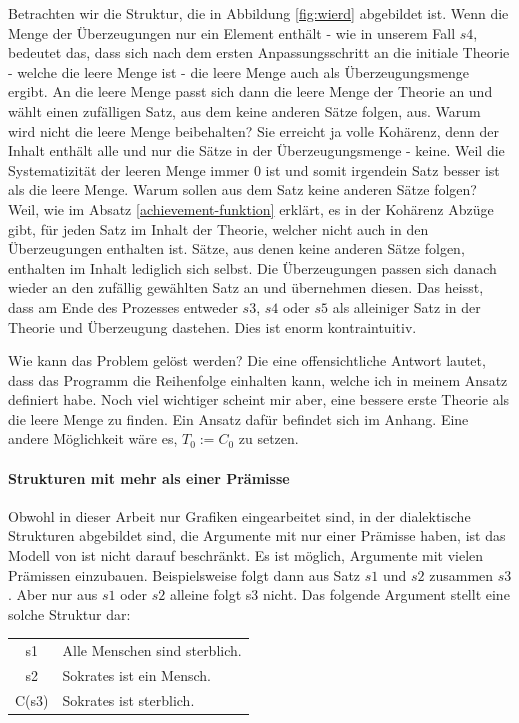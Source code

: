 \documentclass{article}
\begin{document}
Betrachten wir die Struktur, die in Abbildung \ref{fig:wierd} abgebildet ist. Wenn die Menge der Überzeugungen nur ein Element enthält - wie in unserem Fall $s4$, bedeutet das, dass sich nach dem ersten Anpassungsschritt an die initiale Theorie - welche die leere Menge ist - die leere Menge auch als Überzeugungsmenge ergibt. An die leere Menge passt sich dann die leere Menge der Theorie an und wählt einen zufälligen Satz, aus dem keine anderen Sätze folgen, aus. Warum wird nicht die leere Menge beibehalten? Sie erreicht ja volle Kohärenz, denn der Inhalt enthält alle und nur die Sätze in der Überzeugungsmenge - keine. Weil die Systematizität der leeren Menge immer 0 ist und somit irgendein Satz besser ist als die leere Menge. Warum sollen aus dem Satz keine anderen Sätze folgen? Weil, wie im Absatz \ref{achievement-funktion} erklärt, es in der Kohärenz Abzüge gibt, für jeden Satz im Inhalt der Theorie, welcher nicht auch in den Überzeugungen enthalten ist. Sätze, aus denen keine anderen Sätze folgen,  enthalten im Inhalt lediglich sich selbst.
Die Überzeugungen passen sich danach wieder an den zufällig gewählten Satz an und übernehmen diesen. Das heisst, dass am Ende des Prozesses entweder $s3$, $s4$ oder $s5$ als alleiniger Satz in der Theorie und Überzeugung dastehen. Dies ist enorm kontraintuitiv.

Wie kann das Problem gelöst werden? Die eine offensichtliche Antwort lautet, dass das Programm die Reihenfolge einhalten kann, welche ich in meinem Ansatz definiert habe. Noch viel wichtiger scheint mir aber, eine bessere erste Theorie als die leere Menge zu finden. Ein Ansatz dafür befindet sich im Anhang. Eine andere Möglichkeit wäre es, $T_0 := C_0$ zu setzen.

\paragraph{Strukturen mit mehr als einer Prämisse}
Obwohl in dieser Arbeit nur Grafiken eingearbeitet sind, in der dialektische Strukturen abgebildet sind, die Argumente mit nur einer Prämisse haben, ist das Modell von \citeauthor{beisbart_making_2021} ist nicht darauf beschränkt. Es ist möglich, Argumente mit vielen Prämissen einzubauen. Beispielsweise folgt dann aus Satz $s1$ und $s2$ zusammen $s3$. Aber nur aus $s1$ oder $s2$ alleine folgt s3 nicht. Das folgende Argument stellt eine solche Struktur dar:

\begin{center}
\begin{tabular}{c p{9cm}}
s1 & Alle Menschen sind sterblich.\\
s2 & Sokrates ist ein Mensch.\\\hline
C(s3) & Sokrates ist sterblich. 
\end{tabular}
\end{center}
\end{document}
